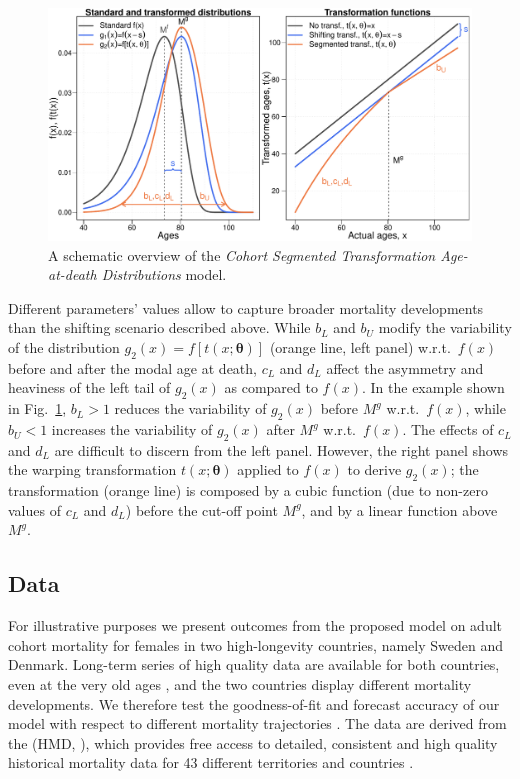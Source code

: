 \documentclass[11pt, a4paper]{article}
\begin{document}
\begin{figure}[t]
	\begin{center}
		\includegraphics[scale=0.57]{./Figures/F1.pdf} 
		\caption{A schematic overview of the \emph{Cohort Segmented Transformation Age-at-death Distributions} model.\label{Fig:CSTADmodel}}    
	\end{center}
\end{figure}

Different parameters' values allow to capture broader mortality developments than the shifting scenario described above. While $b_L$ and $b_U$ modify the variability of the distribution $g_2(x)=f\left[t(x;\bm{\theta})\right]$ (orange line, left panel) w.r.t.~$f(x)$ before and after the modal age at death, $c_L$ and $d_L$ affect the asymmetry and heaviness of the left tail of $g_2(x)$ as compared to $f(x)$. In the example shown in Fig.~\ref{Fig:CSTADmodel}, $b_L > 1$ reduces the variability of $g_2(x)$ before $M^g$ w.r.t.~$f(x)$, while $b_U < 1$ increases the variability of $g_2(x)$ after $M^g$ w.r.t.~$f(x)$. The effects of $c_L$ and $d_L$ are difficult to discern from the left panel. However, the right panel shows the warping transformation $t(x;\bm{\theta})$ applied to $f(x)$ to derive $g_2(x)$; the transformation (orange line) is composed by a cubic function (due to non-zero values of $c_L$ and $d_L$) before the cut-off point $M^g$, and by a linear function above $M^g$.

\subsection{Data}
\label{Subsec:Data}
For illustrative purposes we present outcomes from the proposed model on adult cohort mortality for females in two high-longevity countries, namely Sweden and Denmark. Long-term series of high quality data are available for both countries, even at the very old ages \citep{vaupel1994longer,wilmoth1996extreme,AndreevBookDanemark}, and the two countries display different mortality developments. We therefore test the goodness-of-fit and forecast accuracy of our model with respect to different mortality trajectories \citep{ChristensenEtAlDenmarkSwedenDivergence2010}. The data are derived from the \citeauthor{HMD} (HMD, \citeyear{HMD}), which provides free access to detailed, consistent and high quality historical mortality data for 43 different territories and countries \citep{barbieri2015data}.
\end{document}
